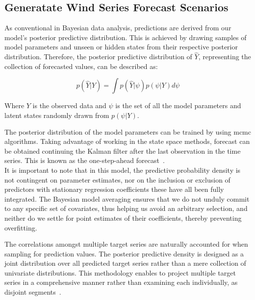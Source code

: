 \subsection{Generatate Wind Series Forecast Scenarios}
    \label{sec:wind_forecast_scenarios}

    As conventional in Bayesian data analysis, predictions are derived from our model's posterior predictive distribution.
    This is achieved by drawing samples of model parameters and unseen or hidden states from their respective posterior distribution.
    Therefore, the posterior predictive distribution of $\hat{Y}$, representing the collection of forecasted values, can be described as:

    \begin{equation}
        p(\hat{Y} | Y) = \int p(\hat{Y} | \psi) p(\psi | Y) d\psi
    \label{eq:posterior_predictive}
    \end{equation}

    Where $Y$ is the observed data and $\psi$ is the set of all the model parameters and latent states randomly drawn from
    $p(\psi | Y)$.

    The posterior distribution of the model parameters can be trained by using \gls{mcmc} algorithms.
    Taking advantage of working in the state space methods, forecast can be obtained continuing the Kalman filter after
    the last observation in the time series.
    This is known as the one-step-ahead forecast~\cite{durbin_time_2012}. \\

    It is important to note that in this model, the predictive probability density is not contingent on parameter estimates,
    nor on the inclusion or exclusion of predictors with stationary regression coefficients these have all been fully integrated.
    The Bayesian model averaging ensures that we do not unduly commit to any specific set of covariates,
    thus helping us avoid an arbitrary selection, and neither do we settle for point estimates of their coefficients,
    thereby preventing overfitting.

    The correlations amongst multiple target series are naturally accounted for when sampling for prediction values.
    The posterior predictive density is designed as a joint distribution over all predicted target series rather than a
    mere collection of univariate distributions.
    This methodology enables to project multiple target series in a comprehensive manner rather than examining each individually,
    as disjoint segments~\cite{qiu_multivariate_2018}.

